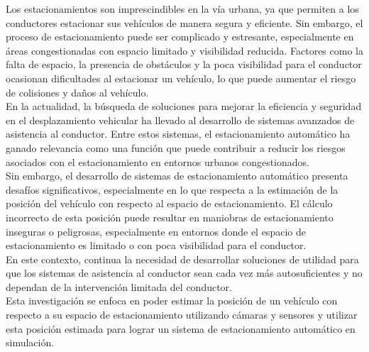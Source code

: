 Los estacionamientos son imprescindibles en la vía urbana, ya que permiten a los conductores estacionar sus vehículos
de manera segura y eficiente. Sin embargo, el proceso de estacionamiento puede ser complicado y estresante,
especialmente en áreas congestionadas con espacio limitado y visibilidad reducida.
Factores como la falta de espacio, la presencia de obstáculos y la poca visibilidad para el conductor ocasionan
dificultades al estacionar un vehículo, lo que puede aumentar el riesgo de colisiones y daños al vehículo.
\\
En la actualidad, la búsqueda de soluciones para mejorar la eficiencia y seguridad en el desplazamiento vehicular
ha llevado al desarrollo de sistemas avanzados de asistencia al conductor.
Entre estos sistemas, el estacionamiento automático ha ganado relevancia como una función que puede contribuir
a reducir los riesgos asociados con el estacionamiento en entornos urbanos congestionados.
\\
Sin embargo, el desarrollo de sistemas de estacionamiento automático presenta desafíos significativos,
especialmente en lo que respecta a la estimación de la posición del vehículo con respecto al espacio de estacionamiento.
El cálculo incorrecto de esta posición puede resultar en maniobras de estacionamiento inseguras o peligrosas,
especialmente en entornos donde el espacio de estacionamiento es limitado o con poca visibilidad para el conductor.
\\
En este contexto, continua la necesidad de desarrollar soluciones de utilidad para que los sistemas de asistencia al conductor
sean cada vez más autosuficientes y no dependan de la intervención limitada del conductor.
\\
Esta investigación se enfoca en poder estimar la posición de un vehículo con respecto a su espacio de estacionamiento
utilizando cámaras y sensores y utilizar esta posición estimada para lograr un sistema de estacionamiento automático en simulación.